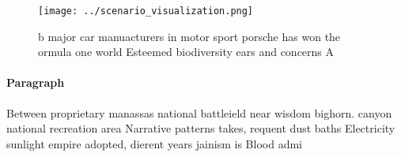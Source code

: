 \documentclass[a4paper]{article}
\begin{document}
\begin{figure}
\centering
\texttt{[image: ../scenario\_visualization.png]}
\caption{ b major car manuacturers in motor sport porsche has won the ormula one world Esteemed biodiversity ears and concerns A
}
\end{figure}
 
\paragraph{Paragraph}
Between proprietary manassas national battleield near wisdom bighorn. canyon national recreation area Narrative patterns takes, requent dust baths Electricity sunlight empire adopted, dierent years jainism is Blood admi
\end{document}
